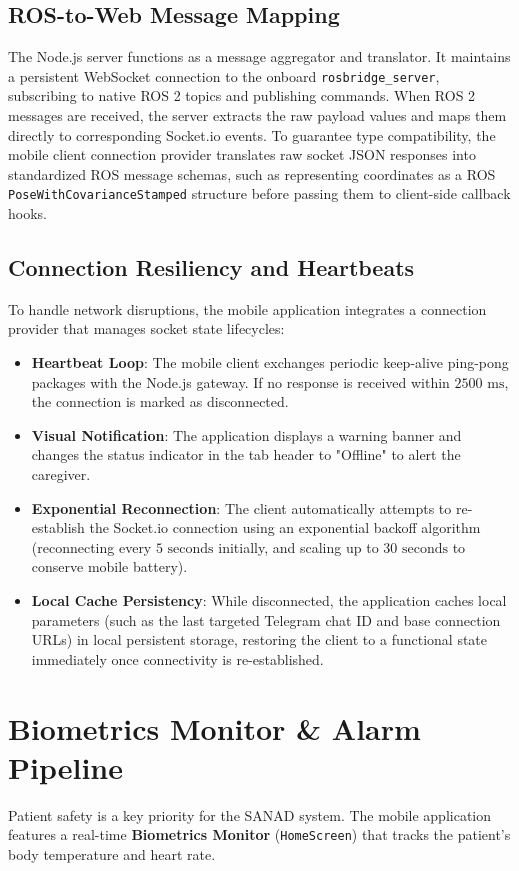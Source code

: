 \subsection{ROS-to-Web Message Mapping}
The Node.js server functions as a message aggregator and translator. It maintains a persistent WebSocket connection to the onboard \texttt{rosbridge\_server}, subscribing to native ROS 2 topics and publishing commands. When ROS 2 messages are received, the server extracts the raw payload values and maps them directly to corresponding Socket.io events. To guarantee type compatibility, the mobile client connection provider translates raw socket JSON responses into standardized ROS message schemas, such as representing coordinates as a ROS \texttt{PoseWithCovarianceStamped} structure before passing them to client-side callback hooks.

\subsection{Connection Resiliency and Heartbeats}
To handle network disruptions, the mobile application integrates a connection provider that manages socket state lifecycles:
\begin{itemize}
    \item \textbf{Heartbeat Loop}: The mobile client exchanges periodic keep-alive ping-pong packages with the Node.js gateway. If no response is received within $2500\text{ ms}$, the connection is marked as disconnected.
    \item \textbf{Visual Notification}: The application displays a warning banner and changes the status indicator in the tab header to "Offline" to alert the caregiver.
    \item \textbf{Exponential Reconnection}: The client automatically attempts to re-establish the Socket.io connection using an exponential backoff algorithm (reconnecting every $5\text{ seconds}$ initially, and scaling up to $30\text{ seconds}$ to conserve mobile battery).
    \item \textbf{Local Cache Persistency}: While disconnected, the application caches local parameters (such as the last targeted Telegram chat ID and base connection URLs) in local persistent storage, restoring the client to a functional state immediately once connectivity is re-established.
\end{itemize}


\section{Biometrics Monitor \& Alarm Pipeline}
Patient safety is a key priority for the SANAD system. The mobile application features a real-time \textbf{Biometrics Monitor} (\texttt{HomeScreen}) that tracks the patient's body temperature and heart rate.

